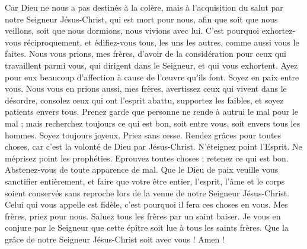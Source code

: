 \begin{multicols}{2}
Car Dieu ne nous a pas destinés à la colère, mais à l'acquisition du salut par notre Seigneur Jésus-Christ,
qui est mort pour nous, afin que soit que nous veillons, soit que nous dormions, nous vivions avec lui.
C'est pourquoi exhortez-vous réciproquement, et édifiez-vous tous, les uns les autres, comme aussi vous le faites.
Nous vous prions, mes frères, d'avoir de la considération pour ceux qui travaillent parmi vous, qui dirigent dans le Seigneur, et qui vous exhortent.
Ayez pour eux beaucoup d'affection à cause de l'œuvre qu'ils font. Soyez en paix entre vous.
Nous vous en prions aussi, mes frères, avertissez ceux qui vivent dans le désordre, consolez ceux qui ont l'esprit abattu, supportez les faibles, et soyez patients envers tous.
Prenez garde que personne ne rende à autrui le mal pour le mal ; mais recherchez toujours ce qui est bon, soit entre vous, soit envers tous les hommes.
Soyez toujours joyeux.
Priez sans cesse.
Rendez grâces pour toutes choses, car c'est la volonté de Dieu par Jésus-Christ.
N'éteignez point l'Esprit.
Ne méprisez point les prophéties.
Eprouvez toutes choses ; retenez ce qui est bon.
Abstenez-vous de toute apparence de mal.
Que le Dieu de paix veuille vous sanctifier entièrement, et faire que votre être entier, l’esprit, l'âme et le corps soient conservés sans reproche lors de la venue de notre Seigneur Jésus-Christ.
Celui qui vous appelle est fidèle, c'est pourquoi il fera ces choses en vous.
Mes frères, priez pour nous.
Saluez tous les frères par un saint baiser.
Je vous en conjure par le Seigneur que cette épître soit lue à tous les saints frères.
Que la grâce de notre Seigneur Jésus-Christ soit avec vous ! Amen !
\PPE{}
\end{multicols}
